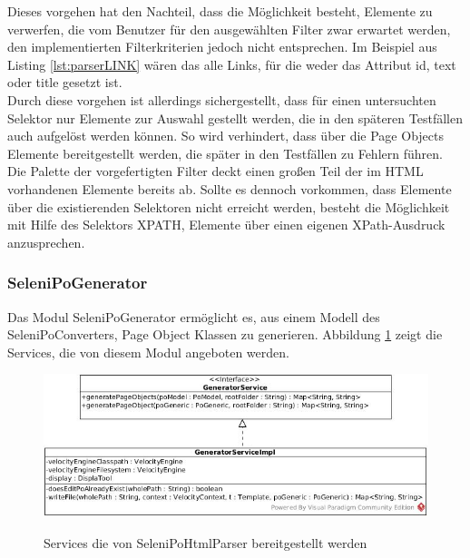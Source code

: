 Dieses vorgehen hat den Nachteil, dass die Möglichkeit besteht, Elemente zu verwerfen, die vom Benutzer für den ausgewählten Filter zwar erwartet werden, den implementierten Filterkriterien jedoch nicht entsprechen.
Im Beispiel aus Listing \ref{lst:parserLINK} wären das alle Links, für die weder das Attribut id, text oder title gesetzt ist.\\
Durch diese vorgehen ist allerdings sichergestellt, dass für einen untersuchten Selektor nur Elemente zur Auswahl gestellt werden, die in den späteren Testfällen auch aufgelöst werden können. So wird verhindert, dass über die Page Objects Elemente bereitgestellt werden, die später in den Testfällen zu Fehlern führen.\\
Die Palette der vorgefertigten Filter deckt einen großen Teil der im HTML vorhandenen Elemente bereits ab. Sollte es dennoch vorkommen, dass Elemente über die existierenden Selektoren nicht erreicht werden, besteht die Möglichkeit mit Hilfe des Selektors XPATH, Elemente über einen eigenen XPath-Ausdruck anzusprechen.



\subsubsection{SeleniPoGenerator}
\label{sec:selenipogenerator}
Das Modul SeleniPoGenerator ermöglicht es, aus einem Modell des SeleniPoConverters, Page Object Klassen zu generieren.
Abbildung \ref{fig:generator_service} zeigt die Services, die von diesem Modul angeboten werden.

\begin{figure}[htb]
  \centering  
  \includegraphics[scale=0.5]{img/SelenipoGenerator.jpg}\\
  \caption{Services die von SeleniPoHtmlParser bereitgestellt werden}
  \label{fig:generator_service}
\end{figure}

